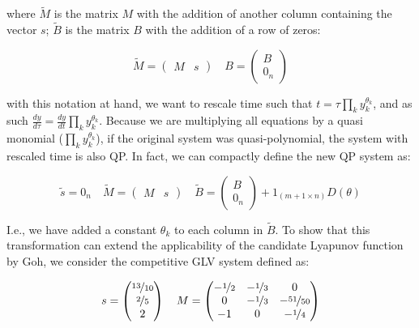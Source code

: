 \documentclass{article}
\begin{document}
\noindent where \(\tilde{M}\) is the matrix \(M\) with the addition of
another column containing the vector \(s\); \(\tilde{B}\) is the matrix
\(B\) with the addition of a row of zeros:

\begin{equation}
\tilde{M} = \left(\begin{array}{c|c} 
M & s
\end{array}
\right) \quad B = \left( \begin{array}{c} B \\ \hline 0_n \end{array} \right)
\end{equation}

with this notation at hand, we want to rescale time such that
\(t = \tau \prod_{k} y_k^{\theta_k}\), and as such
\(\frac{d y}{d\tau} = \frac{d y}{d t} \prod_{k} y_k^{\theta_k}\).
Because we are multiplying all equations by a quasi monomial
(\(\prod_{k} y_k^{\theta_k}\)), if the original system was
quasi-polynomial, the system with rescaled time is also QP. In fact, we
can compactly define the new QP system as:

\begin{equation}
\tilde{s} = 0_{n} \quad \tilde{M} = \left(\begin{array}{c|c} 
M & s
\end{array} \right) \quad 
\tilde{B} =  \left( \begin{array}{c} B \\ \hline 0_n \end{array} \right) + 1_{(m+1 \times n)} D(\theta)
\end{equation}

I.e., we have added a constant \(\theta_k\) to each column in
\(\tilde{B}\). To show that this transformation can extend the
applicability of the candidate Lyapunov function by Goh, we consider the
competitive GLV system defined as:

\begin{equation}
s = \begin{pmatrix}
\nicefrac{13}{10}\\
\nicefrac{2}{5}\\
2
\end{pmatrix} \quad
M = \begin{pmatrix}
-\nicefrac{1}{2} & -\nicefrac{1}{3} & 0\\
0 &  -\nicefrac{1}{3} &  -\nicefrac{51}{50}\\
-1 & 0 & -\nicefrac{1}{4}
\end{pmatrix} 
\end{equation}
\end{document}
